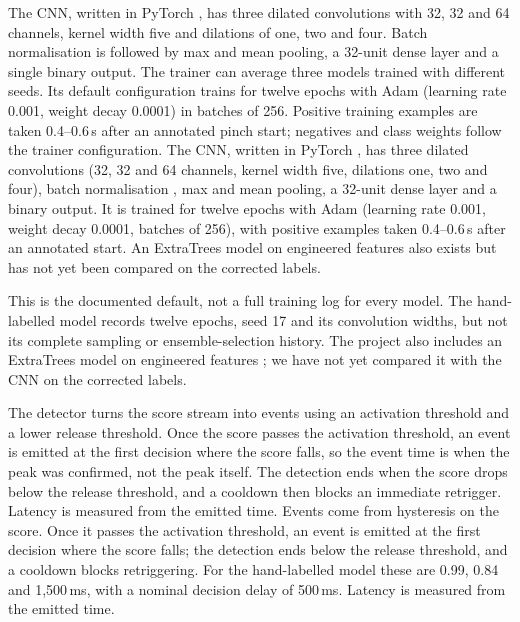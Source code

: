 \iffull
{}\label{models-and-learning-configuration}
\fi

\iffull
The CNN, written in PyTorch \cite{pytorch}, has three dilated convolutions \cite{yu2016dilated,bai2018tcn} with 32, 32 and 64 channels, kernel width five and dilations of one, two and four. Batch normalisation \cite{ioffe2015batchnorm} is followed by max and mean pooling, a 32-unit dense layer and a single binary output. The trainer can average three models trained with different seeds. Its default configuration trains for twelve epochs with Adam \cite{kingma2015adam} (learning rate 0.001, weight decay 0.0001) in batches of 256. Positive training examples are taken 0.4--0.6\,s after an annotated pinch start; negatives and class weights follow the trainer configuration.
\else
The CNN, written in PyTorch \cite{pytorch}, has three dilated convolutions \cite{yu2016dilated,bai2018tcn} (32, 32 and 64 channels, kernel width five, dilations one, two and four), batch normalisation \cite{ioffe2015batchnorm}, max and mean pooling, a 32-unit dense layer and a binary output. It is trained for twelve epochs with Adam \cite{kingma2015adam} (learning rate 0.001, weight decay 0.0001, batches of 256), with positive examples taken 0.4--0.6\,s after an annotated start. An ExtraTrees model on engineered features \cite{geurts2006extra,sklearn} also exists but has not yet been compared on the corrected labels.
\fi

\iffull
This is the documented default, not a full training log for every model. The hand-labelled model records twelve epochs, seed 17 and its convolution widths, but not its complete sampling or ensemble-selection history. The project also includes an ExtraTrees model on engineered features \cite{geurts2006extra,sklearn}; we have not yet compared it with the CNN on the corrected labels.
\fi

\iffull
{}\label{from-scores-to-emitted-events}
\fi

\iffull
The detector turns the score stream into events using an activation threshold and a lower release threshold. Once the score passes the activation threshold, an event is emitted at the first decision where the score falls, so the event time is when the peak was confirmed, not the peak itself. The detection ends when the score drops below the release threshold, and a cooldown then blocks an immediate retrigger. Latency is measured from the emitted time.
\else
Events come from hysteresis on the score. Once it passes the activation threshold, an event is emitted at the first decision where the score falls; the detection ends below the release threshold, and a cooldown blocks retriggering. For the hand-labelled model these are 0.99, 0.84 and 1,500\,ms, with a nominal decision delay of 500\,ms. Latency is measured from the emitted time.
\fi


